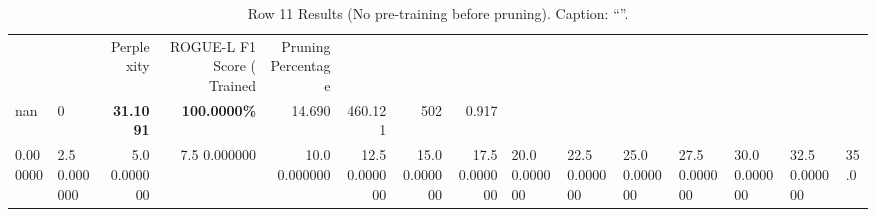 \begin{table}
\caption{Row 11 Results (No pre-training before pruning). \ifshowcaption{}Caption: ``''.\fi}
\label{tab:evaluation-pipeline-11-untrained}
\begin{tabular}{llrrrrrr}
 &  & Perplexity & ROGUE-L F1 Score (%
Trained & Pruning Percentage &  &  &  &  &  &  \\
nan & 0 & \bfseries 31.1091 & \bfseries 100.0000\% & 14.690 & 460.121 & 502 & 0.917 \\
0.000000 & 2.5%
0.000000 & 5.0%
0.000000 & 7.5%
0.000000 & 10.0%
0.000000 & 12.5%
0.000000 & 15.0%
0.000000 & 17.5%
0.000000 & 20.0%
0.000000 & 22.5%
0.000000 & 25.0%
0.000000 & 27.5%
0.000000 & 30.0%
0.000000 & 32.5%
0.000000 & 35.0%

\end{tabular}
\end{table}
